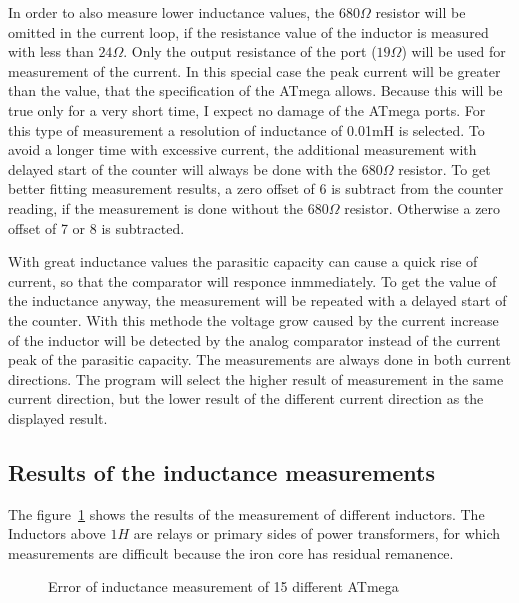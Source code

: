 In order to also measure lower inductance values, the \(680 \Omega\) resistor will be omitted in the current loop,
if the resistance value of the inductor is measured with less than \(24 \Omega\).
Only the output resistance of the port (\(19 \Omega\)) will be used for measurement of the current.
In this special case the peak current will be greater than the value, that the specification of the ATmega allows.
Because this will be true only for a very short time, I expect no damage of the ATmega ports.
For this type of measurement a resolution of inductance of 0.01mH is selected.
To avoid a longer time with excessive current, the additional measurement with delayed start of the counter will always be
done with the \(680 \Omega\) resistor.
To get better fitting measurement results, a zero offset of 6 is subtract from the counter reading, 
if the measurement is done without the \(680 \Omega\) resistor. Otherwise a zero offset of 7 or 8 is subtracted.


With great inductance values the parasitic capacity can cause a quick rise of current, so that the comparator
will responce inmmediately.
To get the value of the inductance anyway, the measurement will be repeated with a delayed start of the counter.
With this methode the voltage grow caused by the current increase of the inductor will be detected by the
analog comparator instead of the current peak of the parasitic capacity.
The measurements are always done in both current directions.
The program will select the higher result of measurement in the same current direction, but the
lower result of the different current direction as the displayed result.

\subsection{Results of the inductance measurements}
The figure~\ref{fig:Induct328p} shows the results of the measurement of different inductors.
The Inductors above \(1 H\) are relays or primary sides of power transformers, for which
measurements are difficult because the iron core has residual remanence.


\begin{figure}[H]
\centering

\caption{Error of inductance measurement of 15 different ATmega}
\label{fig:Induct328p}
\end{figure}

